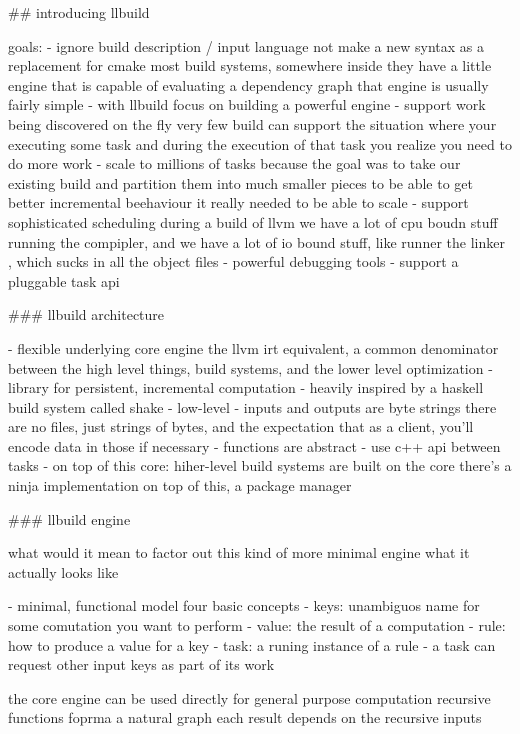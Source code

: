 \documentclass[12pt, a4paper]{report}
\begin{document}
## introducing llbuild

  goals:
  - ignore build description / input language
    not make a new syntax as a replacement for cmake
    most build systems, somewhere inside they have a little engine that is capable of evaluating a dependency graph
    that engine is usually fairly simple
  - with llbuild focus on building a powerful engine
    - support work being discovered on the fly
      very few build can support the situation where your executing some task and during the execution of that task you realize you need to do more work
    - scale to millions of tasks
      because the goal was to take our existing build and partition them into much smaller pieces to be able to get better incremental beehaviour it really needed to be able to scale
    - support sophisticated scheduling
      during a build of llvm we have a lot of cpu boudn stuff running the compipler, and we have a lot of io bound stuff, like runner the linker , which sucks in all the object files
    - powerful debugging tools
  - support a pluggable task api

### llbuild architecture

  - flexible underlying core engine
    the llvm irt equivalent, a common denominator between the high level things, build systems, and the lower level optimization
    - library for persistent, incremental computation
    - heavily inspired by a haskell build system called shake
    - low-level
      - inputs and outputs are byte strings
        there are no files, just strings of bytes, and the expectation that as a client, you'll encode data in those if necessary
      - functions are abstract
      - use c++ api between tasks
    - on top of this core: hiher-level build systems are built on the core
      there's a ninja implementation on top of this, a package manager

### llbuild engine

  what would it mean to factor out this kind of more minimal engine
  what it actually looks like

  - minimal, functional model
    four basic concepts
    - keys: unambiguos name for some comutation you want to perform
    - value: the result of a computation
    - rule: how to produce a value for a key
    - task: a runing instance of a rule
      - a task can request other input keys as part of its work

  the core engine can be used directly for general purpose computation
  recursive functions foprma a natural graph
    each result depends on the recursive inputs
\end{document}
